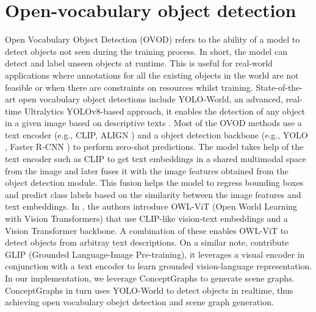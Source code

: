 \section{Open-vocabulary object detection}
Open Vocabulary Object Detection (OVOD) refers to the ability of a model to detect objects not seen during the training process. 
In short, the model can detect and label unseen objects at runtime. This is useful for real-world applications where annotations for all the 
existing objects in the world are not feasible or when there are constraints on resources whilst training. State-of-the-art open vocabulary object detections include
YOLO-World, an advanced, real-time Ultralytics YOLOv8-based approach, it enables the detection of any object in a given image based on descriptive texts \cite{cheng2024yolow}. 
Most of the OVOD methods use a text encoder  (e.g., CLIP, ALIGN \cite{jia2021scalingvisualvisionlanguagerepresentation}) and a object detection backbone (e.g., YOLO \cite{redmon2016lookonceunifiedrealtime}, Faster R-CNN \cite{ren2016fasterrcnnrealtimeobject}) to perform zero-shot predictions. The model takes
help of the text encoder such as CLIP to get text embeddings in a shared multimodal space from the image and later fuses it with the image features obtained from the 
object detection module. This fusion helps the model to regress bounding boxes and predict class labels based on the similarity between the image features and text embeddings.
In \cite{minderer2022simpleopenvocabularyobjectdetection}, the authors introduce OWL-ViT (Open World Learning with Vision Transformers) that use CLIP-like vision-text embeddings and a Vision Transformer backbone.
 A combination of these enables OWL-ViT  to detect objects from arbitray text descriptions. On a similar note, \citet{li2022groundedlanguageimagepretraining} contribute
 GLIP (Grounded Language-Image Pre-training), it leverages a visual encoder in conjunction with a text encoder to learn grounded vision-language representation.\\
In our implementation, we leverage ConceptGraphs to generate scene graphs. ConceptGraphs in turn uses YOLO-World to detect objects in realtime, thus
achieving open vocabulary obejct detection and scene graph generation. \\

